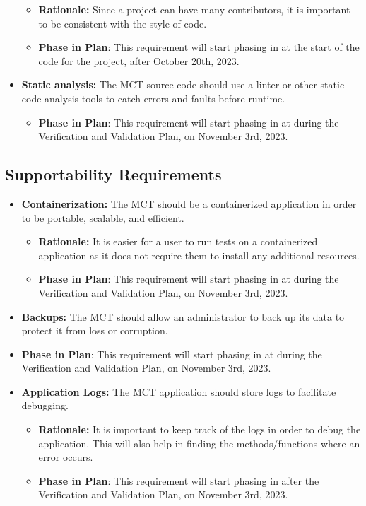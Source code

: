 \documentclass[12pt]{article}
\begin{document}
\begin{itemize}
    \begin{itemize}
        \item \textbf{Rationale: }Since a project can have many contributors, it is important to be consistent with the style of code.
        \item \textbf{Phase in Plan}: This requirement will start phasing in at the start of the code for the project, after October 20th, 2023.
    \end{itemize}
    \item \textbf{Static analysis:} The MCT source code should use a linter or other static code analysis tools to catch errors and faults before runtime.
    \begin{itemize}
        \item \textbf{Phase in Plan}: This requirement will start phasing in at during the Verification and Validation Plan, on November 3rd, 2023.
    \end{itemize}
\end{itemize}


\subsection{Supportability Requirements}

\begin{itemize}
    \item \textbf{Containerization: }The MCT should be a containerized application in order to be portable, scalable, and efficient.
    \begin{itemize}
        \item \textbf{Rationale: }It is easier for a user to run tests on a containerized application as it does not require them to install any additional resources.
        \item \textbf{Phase in Plan}: This requirement will start phasing in at during the Verification and Validation Plan, on November 3rd, 2023.
    \end{itemize}
    \item \textbf{Backups: }The MCT should allow an administrator to back up its data to protect it from loss or corruption.
    \item \textbf{Phase in Plan}: This requirement will start phasing in at during the Verification and Validation Plan, on November 3rd, 2023.
    \item \textbf{Application Logs:} The MCT application should store logs to facilitate debugging.
    \begin{itemize}
        \item \textbf{Rationale: }It is important to keep track of the logs in order to debug the application. This will also help in finding the methods/functions where an error occurs.
        \item \textbf{Phase in Plan}: This requirement will start phasing in after the Verification and Validation Plan, on November 3rd, 2023.
    \end{itemize}
\end{itemize}
\end{document}
